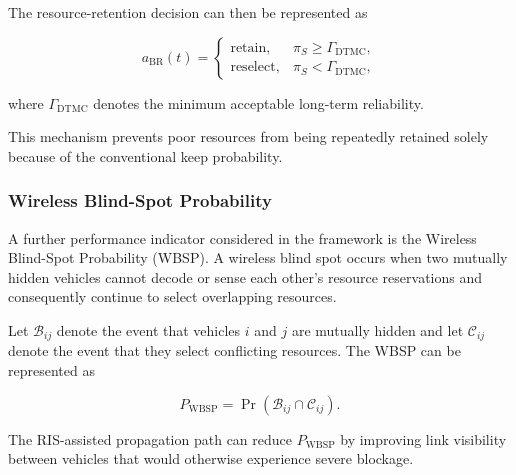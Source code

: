 The resource-retention decision can then be represented as

\begin{equation}
a_{\mathrm{BR}}(t)
=
\begin{cases}
\mathrm{retain},
&
\pi_S
\geq
\Gamma_{\mathrm{DTMC}},
\\
\mathrm{reselect},
&
\pi_S
<
\Gamma_{\mathrm{DTMC}},
\end{cases}
\label{eq:ris_dtmc_decision}
\end{equation}

where $\Gamma_{\mathrm{DTMC}}$ denotes the minimum acceptable
long-term reliability.

This mechanism prevents poor resources from being repeatedly retained
solely because of the conventional keep probability.

\subsubsection{Wireless Blind-Spot Probability}

A further performance indicator considered in the framework is the
Wireless Blind-Spot Probability (WBSP). A wireless blind spot occurs
when two mutually hidden vehicles cannot decode or sense each other's
resource reservations and consequently continue to select overlapping
resources.

Let $\mathcal{B}_{ij}$ denote the event that vehicles $i$ and $j$ are
mutually hidden and let $\mathcal{C}_{ij}$ denote the event that they
select conflicting resources. The WBSP can be represented as

\begin{equation}
P_{\mathrm{WBSP}}
=
\Pr
\left(
\mathcal{B}_{ij}
\cap
\mathcal{C}_{ij}
\right).
\label{eq:ris_wbsp}
\end{equation}

The RIS-assisted propagation path can reduce
$P_{\mathrm{WBSP}}$ by improving link visibility between vehicles that
would otherwise experience severe blockage.


